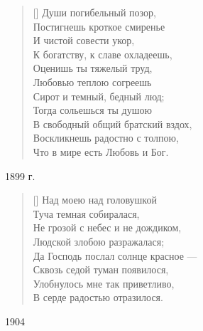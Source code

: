 \begin{verse}[\versewidth]
    Души погибельный позор,\\
Постигнешь кроткое смиренье\\
    И чистой совести укор,\\
К богатству, к славе охладеешь,\\
    Оценишь ты тяжелый труд,\\
Любовью теплою согреешь\\
    Сирот и темный, бедный люд;\\
Тогда сольешься ты душою\\
    В свободный общий братский вздох,\\
Воскликнешь радостно с толпою,\\
    Что в мире есть Любовь и Бог.
\fi
\end{verse}
1899 г.



\settowidth{\versewidth}{Не грозой с небес и не дождиком}
\begin{verse}[\versewidth]
Над моею над головушкой\\
Туча темная собиралася,\\
Не грозой с небес и не дождиком,\\
Людской злобою разражалася;\\
Да Господь послал солнце красное ---\\
Сквозь седой туман появилося,\\
Улобнулось мне так приветливо,\\
В серде радостью отразилося.
\end{verse}
1904

